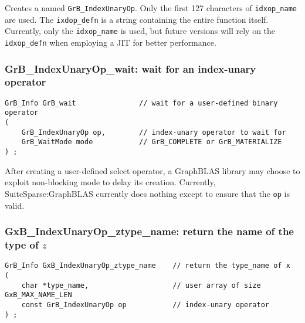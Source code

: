 \documentclass[12pt]{article}
\begin{document}
Creates a named \verb'GrB_IndexUnaryOp'.  Only the first 127 characters of
\verb'idxop_name' are used.  The \verb'ixdop_defn' is a string containing the
entire function itself.  Currently, only the \verb'idxop_name' is used, but
future versions will rely on the \verb'idxop_defn' when employing a JIT for
better performance.

\subsubsection{{\sf GrB\_IndexUnaryOp\_wait:} wait for an index-unary operator}
\label{idxunop_wait}

\begin{mdframed}[userdefinedwidth=6in]
{\footnotesize
\begin{verbatim}
GrB_Info GrB_wait               // wait for a user-defined binary operator
(
    GrB_IndexUnaryOp op,        // index-unary operator to wait for   
    GrB_WaitMode mode           // GrB_COMPLETE or GrB_MATERIALIZE
) ;
\end{verbatim}
}\end{mdframed}

After creating a user-defined select operator, a GraphBLAS library may choose
to exploit non-blocking mode to delay its creation.  Currently,
SuiteSparse:GraphBLAS currently does nothing except to ensure that the
\verb'op' is valid.

\subsubsection{{\sf GxB\_IndexUnaryOp\_ztype\_name:} return the name of the type of $z$}
\label{idxunop_ztype_name}

\begin{mdframed}[userdefinedwidth=6in]
{\footnotesize
\begin{verbatim}
GrB_Info GxB_IndexUnaryOp_ztype_name    // return the type_name of x
(
    char *type_name,                    // user array of size GxB_MAX_NAME_LEN
    const GrB_IndexUnaryOp op           // index-unary operator
) ;
\end{verbatim}
}\end{mdframed}
\end{document}
